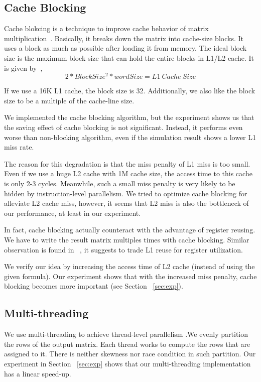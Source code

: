 \documentclass[twocolumn,letterpaper,10pt]{article}
\begin{document}
\subsection{Cache Blocking}
Cache blokcing is a technique to improve cache behavior of matrix
multiplication~\cite{block}. Basically, it breaks down the matrix into
cache-size blocks. It uses a block as much as
possible after loading it from memory. The ideal block size is
the maximum block size that can hold the entire blocks in L1/L2 cache. It
is given by~\cite{davis},
\begin{equation}
  2 * BlockSize^2 * wordSize = L1\ Cache\ Size
\end{equation}

If we use a 16K L1 cache, the block size is 32. Additionally, we also
like the block size to be a multiple of the cache-line size.

We implemented the cache blocking algorithm, but the experiment shows
us that the saving effect of cache blocking is not significant. Instead, it performs even worse than non-blocking
algorithm, even if the simulation result shows a lower L1 miss rate.

The reason for this degradation is that the miss penalty of L1 miss
is too small. Even if we use a huge L2 cache with 1M cache size, the
access time to this cache is only 2-3 cycles. Meanwhile, such a small miss
penalty is very likely to be hidden by instruction-level
parallelism. We tried to optimize cache blocking for alleviate L2
cache miss, however, it seems that L2 miss is also the bottleneck of
our performance, at least in our experiment.

In fact, cache blocking actually counteract with the advantage of
register reusing. We have to write the result matrix multiples times
with cache blocking. Similar observation is found in
~\cite{revisited}, it suggests to trade L1 reuse for register utilization.

We verify our idea by increasing the access time of L2 cache (instead
of using the given formula). Our experiment shows that with the
increased miss penalty, cache blocking becomes more important (see
Section ~\ref{sec:exp}).

\subsection{Multi-threading}
We use multi-threading to achieve thread-level parallelism
.We evenly partition the rows of
the output matrix. Each thread works to compute the rows
that are assigned to it. There is neither skewness nor race condition in such
partition. Our experiment in Section ~\ref{sec:exp} shows that our multi-threading implementation has a linear speed-up.
\end{document}
